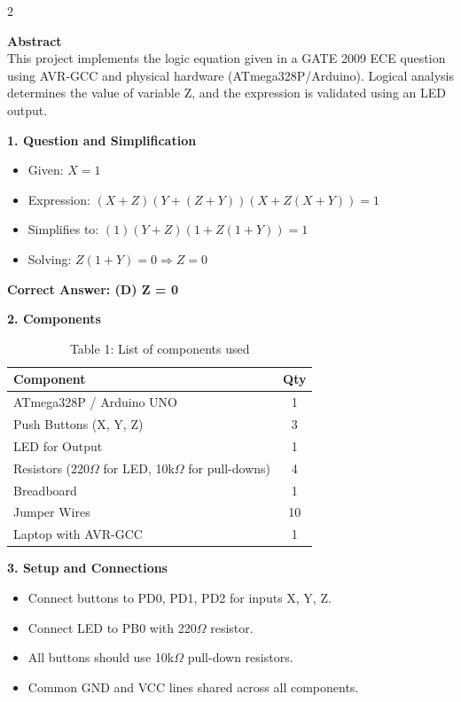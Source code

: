 \documentclass[12pt]{article}
\begin{document}
\begin{multicols}{2}

\vspace{1em}
\noindent\textbf{Abstract} \\
This project implements the logic equation given in a GATE 2009 ECE question using AVR-GCC and physical hardware (ATmega328P/Arduino). Logical analysis determines the value of variable Z, and the expression is validated using an LED output.

\vspace{1em}
\noindent\textbf{1. Question and Simplification}
\begin{itemize}
    \item Given: \( X = 1 \)
    \item Expression: \( (X + Z)(Y + (Z + Y))(X + Z(X + Y)) = 1 \)
    \item Simplifies to: \( (1)(Y + Z)(1 + Z(1 + Y)) = 1 \)
    \item Solving: \( Z(1 + Y) = 0 \Rightarrow Z = 0 \)
\end{itemize}
\textbf{Correct Answer: (D) Z = 0}

\vspace{1em}
\noindent\textbf{2. Components}
\begin{table}[H]
\small
\centering
\begin{tabular}{|p{4.2cm}|c|}
\hline
\textbf{Component} & \textbf{Qty} \\
\hline
ATmega328P / Arduino UNO & 1 \\
Push Buttons (X, Y, Z) & 3 \\
LED for Output & 1 \\
Resistors (220$\Omega$ for LED, 10k$\Omega$ for pull-downs) & 4 \\
Breadboard & 1 \\
Jumper Wires & 10 \\
Laptop with AVR-GCC & 1 \\
\hline
\end{tabular}
\caption*{Table 1: List of components used}
\end{table}

\vspace{1em}
\noindent\textbf{3. Setup and Connections}
\begin{itemize}
    \item Connect buttons to PD0, PD1, PD2 for inputs X, Y, Z.
    \item Connect LED to PB0 with 220$\Omega$ resistor.
    \item All buttons should use 10k$\Omega$ pull-down resistors.
    \item Common GND and VCC lines shared across all components.
\end{itemize}


\end{multicols}
\end{document}
